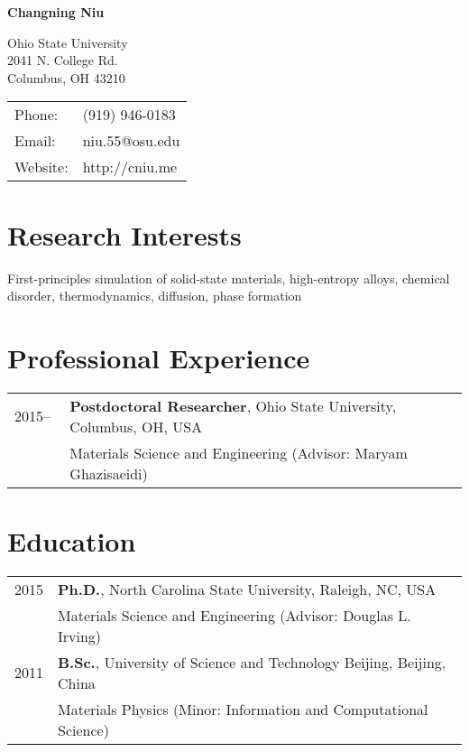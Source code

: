\documentclass[letterpaper,11pt]{article}
\def\name{Changning Niu}
\begin{document}
\thispagestyle{empty}
\centerline{\huge \bf \sc \name}

\vspace{0.25in}

\begin{minipage}{0.50\linewidth}
  Ohio State University \\
  2041 N. College Rd.\\
  Columbus, OH 43210
\end{minipage}
\begin{minipage}{0.50\linewidth}
  \begin{tabular}{ll}
    Phone: & (919) 946-0183 \\
    Email: & niu.55@osu.edu \\
    Website: & http://cniu.me \\
  \end{tabular}
\end{minipage}


\section*{Research Interests}

First-principles simulation of solid-state materials, high-entropy alloys, chemical disorder, thermodynamics, diffusion, phase formation

\section*{Professional Experience}

\begin{tabular}{ll}
2015--\,\,  & \textbf{Postdoctoral Researcher}, Ohio State University, Columbus, OH, USA \\
		   & Materials Science and Engineering (Advisor: Maryam Ghazisaeidi)
\end{tabular}


\section*{Education}

\begin{tabular}{ll}
	2015 & {\bf Ph.D.}, North Carolina State University, Raleigh, NC, USA \\
	     & Materials Science and Engineering (Advisor: Douglas L. Irving) \\
	2011 & {\bf B.Sc.}, University of Science and Technology Beijing, Beijing, China \\
		 & Materials Physics (Minor: Information and Computational Science) \\
\end{tabular}
\end{document}
